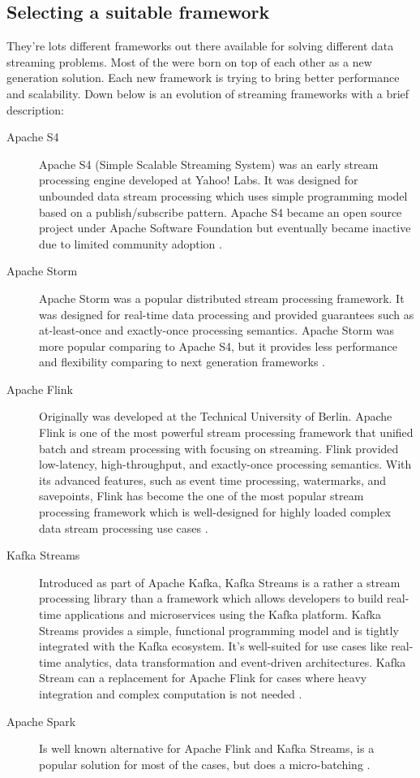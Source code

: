 \subsection{Selecting a suitable framework}\label{subsec:selecting-a-suitable-framework}
They're lots different frameworks out there available for solving different
data streaming problems.
Most of the were born on top of each other as a new generation solution.
Each new framework is trying to bring better performance and scalability.
Down below is an evolution of streaming frameworks \cite{stream_processing_history} with a brief description:

\begin{description}
    \item[Apache S4]  Apache S4 (Simple Scalable Streaming System) was an early stream
    processing engine developed at Yahoo! Labs.
    It was designed for unbounded data stream processing which uses
    simple programming model based on a publish/subscribe pattern.
    Apache S4 became an open source project under Apache Software Foundation but
    eventually became inactive due to limited community adoption \cite{apache_s4_intro}.
    \item[Apache Storm]
    Apache Storm was a popular distributed stream processing framework.
    It was designed for real-time data processing and provided guarantees such as
    at-least-once and exactly-once processing semantics.
    Apache Storm was more popular comparing to Apache S4, but it provides less
    performance and flexibility comparing to next generation frameworks \cite{apache_storm_performance}.
    \item[Apache Flink] Originally was developed at the Technical University of Berlin.
    Apache Flink is one of the most powerful stream processing framework that unified batch and
    stream processing with focusing on streaming.
    Flink provided low-latency, high-throughput, and exactly-once processing semantics.
    With its advanced features, such as event time processing, watermarks, and savepoints,
    Flink has become the one of the most popular stream processing framework which is
    well-designed for highly loaded complex data stream processing use cases \cite{flink_intro}.
    \item[Kafka Streams] Introduced as part of Apache Kafka, Kafka Streams
    is a rather a stream processing library than a framework which allows developers to build real-time
    applications and microservices using the Kafka platform.
    Kafka Streams provides a simple, functional programming model and is tightly
    integrated with the Kafka ecosystem.
    It's well-suited for use cases like real-time analytics, data transformation
    and event-driven architectures.
    Kafka Stream can a replacement for Apache Flink for cases where heavy integration
    and complex computation is not needed \cite{kafka_streams_intro}.
    \item[Apache Spark] Is well known alternative for Apache Flink and Kafka Streams,
    is a popular solution for most of the cases, but does a micro-batching \cite{spark_structured_streaming}.
\end{description}

